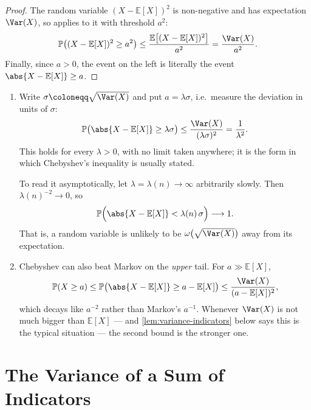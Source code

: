 \begin{proof}
    The random variable \((X - \mathbb{E}[X])^{2}\) is non-negative and has expectation \(\Var(X)\), so  applies to it with threshold \(a^{2}\):
    \[
        \mathbb{P}\bigl( (X - \mathbb{E}[X])^{2} \ge a^{2} \bigr)
        \le \frac{\mathbb{E}\bigl[ (X - \mathbb{E}[X])^{2} \bigr]}{a^{2}}
        = \frac{\Var(X)}{a^{2}}.
    \]
    Finally, since \(a > 0\), the event on the left is literally the event \(\abs{X - \mathbb{E}[X]} \ge a\).
\end{proof}

\begin{remark}\hfill
    \begin{enumerate}[(1)]
        \item Write \(\sigma \coloneqq \sqrt{\Var(X)}\) and put \(a = \lambda \sigma\), i.e.\ measure the deviation in units of \(\sigma\):
        \[
            \mathbb{P}\bigl( \abs{X - \mathbb{E}[X]} \ge \lambda \sigma \bigr)
            \le \frac{\Var(X)}{(\lambda \sigma)^{2}}
            = \frac{1}{\lambda^{2}}.
        \]
        This holds for every \(\lambda > 0\), with no limit taken anywhere; it is the form in which Chebyshev's inequality is usually stated.

        To read it asymptotically, let \(\lambda = \lambda(n) \to \infty\) arbitrarily slowly. Then \(\lambda(n)^{-2} \to 0\), so
        \[
            \mathbb{P}\Bigl( \abs{X - \mathbb{E}[X]} < \lambda(n) \, \sigma \Bigr) \longrightarrow 1 .
        \]
        That is, a random variable is unlikely to be \(\omega\bigl( \sqrt{\Var(X)} \bigr)\) away from its expectation.
        \item Chebyshev can also beat Markov on the \emph{upper} tail. For \(a \gg \mathbb{E}[X]\),
        \[
            \mathbb{P}(X \ge a) \le \mathbb{P}\bigl( \abs{X - \mathbb{E}[X]} \ge a - \mathbb{E}[X] \bigr) \le \frac{\Var(X)}{(a - \mathbb{E}[X])^{2}},
        \]
        which decays like \(a^{-2}\) rather than Markov's \(a^{-1}\). Whenever \(\Var(X)\) is not much bigger than \(\mathbb{E}[X]\) --- and \autoref{lem:variance-indicators} below says this is the typical situation --- the second bound is the stronger one.
    \end{enumerate}
\end{remark}

\section{The Variance of a Sum of Indicators}\label{sec:variance-indicators}

